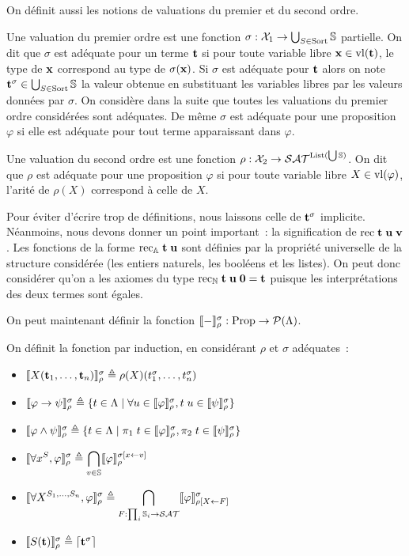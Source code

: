 \documentclass{article}
\begin{document}
On définit aussi les notions de valuations du premier et du second ordre.

\begin{defi}[Valuation]
  Une valuation du premier ordre est une fonction $\sigma : \mathcal X_1 \to \bigcup_{S \in \mathrm{Sort}}\mathbb{S}$ partielle. On dit que $\sigma$ est adéquate pour un terme $\mathbf{t}$ si pour toute variable libre $\mathbf{x}\in \mathrm{vl}(\mathbf{t})$, le type de $\mathbf{x}$ correspond au type de $\sigma(\mathbf{x})$. Si $\sigma$ est adéquate pour $\mathbf{t}$ alors on note $\mathbf{t}^\sigma \in \bigcup_{S\in\mathrm{Sort}}\mathbb{S}$ la valeur obtenue en substituant les variables libres par les valeurs données par $\sigma$. On considère dans la suite que toutes les valuations du premier ordre considérées sont adéquates. De même $\sigma$ est adéquate pour une proposition $\varphi$ si elle est adéquate pour tout terme apparaissant dans $\varphi$.

  Une valuation du second ordre est une fonction $\rho : \mathcal X_2\to \mathcal {SAT}^{\mathrm{List}(\bigcup \mathbb{S})}$. On dit que $\rho$ est adéquate pour une proposition $\varphi$ si pour toute variable libre $X\in\mathrm{vl}(\varphi)$, l'arité de $\rho(X)$ correspond à celle de $X$.
\end{defi}

\begin{rmk}
  Pour éviter d'écrire trop de définitions, nous laissons celle de $\mathbf{t}^\sigma$ implicite. Néanmoins, nous devons donner un point important~: la signification de $\mathrm{rec}\;\mathbf{t}\;\mathbf{u}\;\mathbf{v}$. Les fonctions de la forme $\mathrm{rec}_{\mathbb A}\;\mathbf{t}\;\mathbf{u}$ sont définies par la propriété universelle de la structure considérée (les entiers naturels, les booléens et les listes). On peut donc considérer qu'on a les axiomes du type $\mathrm{rec}_{\mathbb{N}}\;\mathbf{t}\;\mathbf{u}\;\boldsymbol 0 = \mathbf{t}$ puisque les interprétations des deux termes sont égales.
\end{rmk}

On peut maintenant définir la fonction $\llbracket - \rrbracket_\rho^\sigma : \mathrm{Prop} \to \mathcal P(\Lambda)$.

\begin{defi}[Interprétation]
  On définit la fonction par induction, en considérant $\rho$ et $\sigma$ adéquates~:
  \begin{itemize}
  \item $\llbracket X(\mathbf{t}_1,\ldots,\mathbf{t}_n) \rrbracket_\rho^\sigma \triangleq \rho(X)(t_1^\sigma,\ldots,t_n^\sigma)$
  \item $\llbracket \varphi\to\psi \rrbracket_\rho^\sigma\triangleq \{t\in\Lambda\mid \forall u \in \llbracket \varphi \rrbracket_\rho^\sigma, t\;u\in\llbracket \psi \rrbracket_\rho^\sigma\}$
  \item $\llbracket \varphi\land \psi \rrbracket_\rho^\sigma \triangleq \{t\in \Lambda\mid \pi_1\;t\in\llbracket \varphi \rrbracket_\rho^\sigma, \pi_2\;t\in\llbracket \psi \rrbracket_\rho^\sigma\}$
  \item $\displaystyle\llbracket \forall x^S, \varphi \rrbracket_\rho^\sigma \triangleq \bigcap_{v \in \mathbb{S}}\llbracket \varphi \rrbracket_\rho^{\sigma[x \leftarrow v]}$
  \item $\displaystyle\llbracket \forall X^{S_1,\ldots,S_n}, \varphi \rrbracket_\rho^\sigma\triangleq\bigcap_{F : \prod_i \mathbb{S}_i \to \mathcal {SAT}}\llbracket \varphi \rrbracket_{\rho[X \leftarrow F]}^\sigma$
  \item $\llbracket S(\mathbf{t}) \rrbracket_\rho^\sigma \triangleq \lceil \mathbf{t}^\sigma \rceil$
  \end{itemize}
\end{defi}
\end{document}
